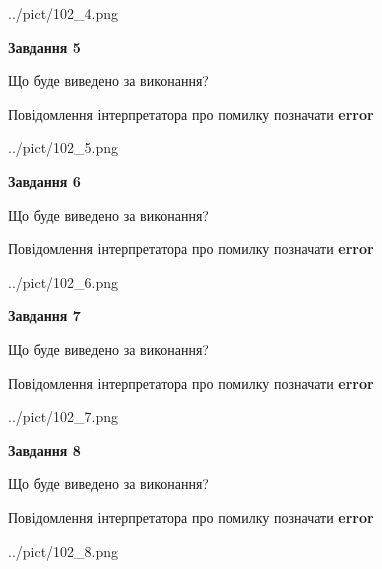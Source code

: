 \documentclass[12pt, ukrainian]{article}
\begin{document}
{\begin{center}
	{../pict/102_4.png}
\end{center}
\newpage

{\begin {center}\textbf{Завдання 5}\end {center}}\par
Що буде виведено за виконання? \par
Повідомлення інтерпретатора про помилку позначати \textbf{error}

\begin{center}
	{../pict/102_5.png}
\end{center}
\newpage

{\begin {center}\textbf{Завдання 6}\end {center}}\par
Що буде виведено за виконання? \par
Повідомлення інтерпретатора про помилку позначати \textbf{error}

\begin{center}
	{../pict/102_6.png}
\end{center}
\newpage

{\begin {center}\textbf{Завдання 7}\end {center}}\par
Що буде виведено за виконання? \par
Повідомлення інтерпретатора про помилку позначати \textbf{error}

\begin{center}
	{../pict/102_7.png}
\end{center}
\newpage

{\begin {center}\textbf{Завдання 8}\end {center}}\par
Що буде виведено за виконання? \par
Повідомлення інтерпретатора про помилку позначати \textbf{error}

\begin{center}
	{../pict/102_8.png}
\end{center}
\newpage

}
\end{document}
